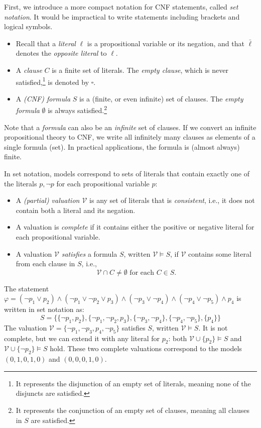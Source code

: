 First, we introduce a more compact notation for CNF statements, called \emph{set notation}. It would be impractical to write statements including brackets and logical symbols.
\begin{itemize}
    \item Recall that a \emph{literal} $\ell$ is a propositional variable or its negation, and that $\bar{\ell}$ denotes the \emph{opposite literal} to $\ell$.
    \item A \emph{clause} $C$ is a finite set of literals. The \emph{empty clause}, which is never satisfied,\footnote{It represents the disjunction of an empty set of literals, meaning none of the disjuncts are satisfied.} is denoted by $\square$.
    \item A \emph{(CNF) formula} $S$ is a (finite, or even infinite) set of clauses. The \emph{empty formula} $\emptyset$ is always satisfied.\footnote{It represents the conjunction of an empty set of clauses, meaning all clauses in $S$ are satisfied.}
\end{itemize}

\begin{remark}
    Note that a \emph{formula} can also be an \emph{infinite} set of clauses. If we convert an infinite propositional theory to CNF, we write all infinitely many clauses as elements of a single formula (set). In practical applications, the formula is (almost always) finite.
\end{remark}

In set notation, models correspond to sets of literals that contain exactly one of the literals $p, \neg p$ for each propositional variable $p$:
\begin{itemize}
    \item A \emph{(partial) valuation $\mathcal{V}$} is any set of literals that is \emph{consistent}, i.e., it does not contain both a literal and its negation.
    \item A valuation is \emph{complete} if it contains either the positive or negative literal for each propositional variable.
    \item A valuation $\mathcal{V}$ \emph{satisfies} a formula $S$, written $\mathcal{V} \models S$, if $\mathcal{V}$ contains some literal from each clause in $S$, i.e.,
    $$
    \mathcal{V} \cap C \neq \emptyset \text{ for each } C \in S.
    $$
\end{itemize}

\begin{example}\label{example:set-representation}
    The statement $\varphi = (\neg p_1 \lor p_2) \land (\neg p_1 \lor \neg p_2 \lor p_3) \land (\neg p_3 \lor \neg p_4) \land (\neg p_4 \lor \neg p_5) \land p_4$ is written in set notation as:
    $$
    S = \{\{\neg p_1, p_2\}, \{\neg p_1, \neg p_2, p_3\}, \{\neg p_3, \neg p_4\}, \{\neg p_4, \neg p_5\}, \{p_4\}\}
    $$
    The valuation $\mathcal{V} = \{\neg p_1, \neg p_3, p_4, \neg p_5\}$ satisfies $S$, written $\mathcal{V} \models S$. It is not complete, but we can extend it with any literal for $p_2$: both $\mathcal{V} \cup \{p_2\} \models S$ and $\mathcal{V} \cup \{\neg p_2\} \models S$ hold. These two complete valuations correspond to the models $(0,1,0,1,0)$ and $(0,0,0,1,0)$.
\end{example}


